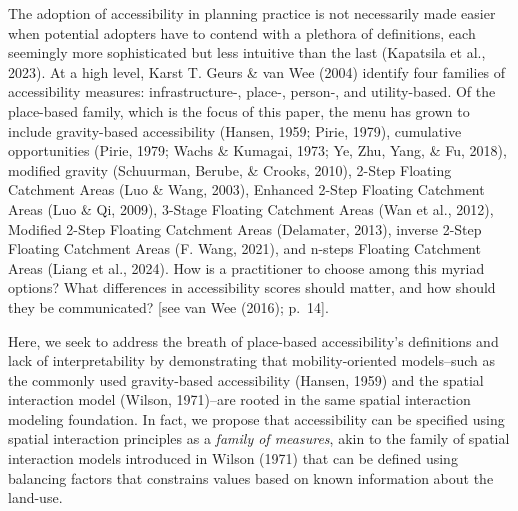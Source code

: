 \documentclass[
11pt, %
oneside, %
english, %
singlespacing, %
]{macthesis} %
\begin{document}
The adoption of accessibility in planning practice is not necessarily made easier when potential adopters have to contend with a plethora of definitions, each seemingly more sophisticated but less intuitive than the last (Kapatsila et al., 2023). At a high level, Karst T. Geurs \& van Wee (2004) identify four families of accessibility measures: infrastructure-, place-, person-, and utility-based. Of the place-based family, which is the focus of this paper, the menu has grown to include gravity-based accessibility (Hansen, 1959; Pirie, 1979), cumulative opportunities (Pirie, 1979; Wachs \& Kumagai, 1973; Ye, Zhu, Yang, \& Fu, 2018), modified gravity (Schuurman, Berube, \& Crooks, 2010), 2-Step Floating Catchment Areas (Luo \& Wang, 2003), Enhanced 2-Step Floating Catchment Areas (Luo \& Qi, 2009), 3-Stage Floating Catchment Areas (Wan et al., 2012), Modified 2-Step Floating Catchment Areas (Delamater, 2013), inverse 2-Step Floating Catchment Areas (F. Wang, 2021), and n-steps Floating Catchment Areas (Liang et al., 2024). How is a practitioner to choose among this myriad options? What differences in accessibility scores should matter, and how should they be communicated? {[}see van Wee (2016); p.~14{]}.

Here, we seek to address the breath of place-based accessibility's definitions and lack of interpretability by demonstrating that mobility-oriented models--such as the commonly used gravity-based accessibility (Hansen, 1959) and the spatial interaction model (Wilson, 1971)--are rooted in the same spatial interaction modeling foundation. In fact, we propose that accessibility can be specified using spatial interaction principles as a \emph{family of measures}, akin to the family of spatial interaction models introduced in Wilson (1971) that can be defined using balancing factors that constrains values based on known information about the land-use.
\end{document}
